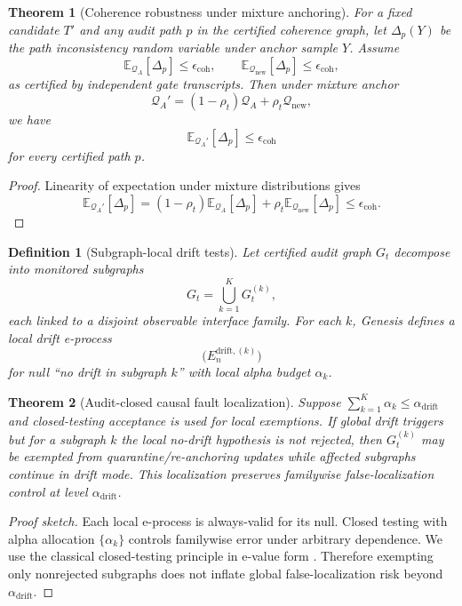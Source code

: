 \documentclass[11pt,a4paper]{article}
\newtheorem{theorem}{Theorem}[section]
\newtheorem{definition}{Definition}[section]
\begin{document}
\begin{theorem}[Coherence robustness under mixture anchoring]
\label{thm:mix-coh}
For a fixed candidate $T'$ and any audit path $p$ in the certified coherence graph, let $\Delta_p(Y)$ be the path inconsistency random variable under anchor sample $Y$.
Assume
\[
\mathbb{E}_{\mathcal{Q}_A}[\Delta_p]\le \epsilon_{\mathrm{coh}},
\qquad
\mathbb{E}_{\mathcal{Q}_{\mathrm{new}}}[\Delta_p]\le \epsilon_{\mathrm{coh}},
\]
as certified by independent gate transcripts.
Then under mixture anchor
\[
\mathcal{Q}_A'=(1-\rho_t)\mathcal{Q}_A+\rho_t\mathcal{Q}_{\mathrm{new}},
\]
we have
\[
\mathbb{E}_{\mathcal{Q}_A'}[\Delta_p]\le \epsilon_{\mathrm{coh}}
\]
for every certified path $p$.
\end{theorem}
\begin{proof}
Linearity of expectation under mixture distributions gives
\[
\mathbb{E}_{\mathcal{Q}_A'}[\Delta_p]
=(1-\rho_t)\mathbb{E}_{\mathcal{Q}_A}[\Delta_p]+\rho_t\mathbb{E}_{\mathcal{Q}_{\mathrm{new}}}[\Delta_p]
\le \epsilon_{\mathrm{coh}}.
\]
\end{proof}

\begin{definition}[Subgraph-local drift tests]
Let certified audit graph $G_t$ decompose into monitored subgraphs
\[
G_t=\bigcup_{k=1}^{K}G_t^{(k)},
\]
each linked to a disjoint observable interface family.
For each $k$, Genesis defines a local drift e-process
\[
\bigl(E_n^{\mathrm{drift},(k)}\bigr)
\]
for null ``no drift in subgraph $k$'' with local alpha budget $\alpha_k$.
\end{definition}

\begin{theorem}[Audit-closed causal fault localization]
\label{thm:fault-local}
Suppose $\sum_{k=1}^{K}\alpha_k\le \alpha_{\mathrm{drift}}$ and closed-testing acceptance is used for local exemptions.
If global drift triggers but for a subgraph $k$ the local no-drift hypothesis is not rejected, then $G_t^{(k)}$ may be exempted from quarantine/re-anchoring updates while affected subgraphs continue in drift mode.
This localization preserves familywise false-localization control at level $\alpha_{\mathrm{drift}}$.
\end{theorem}
\begin{proof}[Proof sketch]
Each local e-process is always-valid for its null.
Closed testing with alpha allocation $\{\alpha_k\}$ controls familywise error under arbitrary dependence.
We use the classical closed-testing principle in e-value form \citep{Marcus1976ClosedTesting}.
Therefore exempting only nonrejected subgraphs does not inflate global false-localization risk beyond $\alpha_{\mathrm{drift}}$.
\end{proof}
\end{document}
